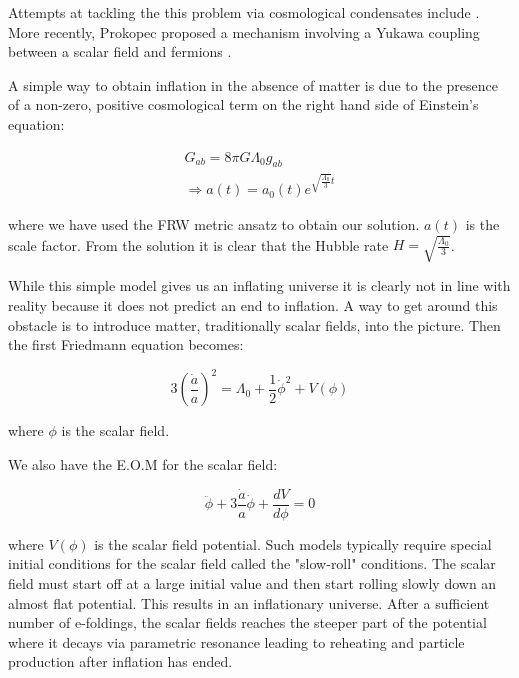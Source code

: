 \begin{doublespace}
\begin{itemize}
\end{itemize}

Attempts at tackling the this problem via cosmological condensates
include \cite{Brandenberger1997Asymptotic, Brout2003Condensation, Arkani-Hamed2004Ghost,
Alexander2004, Alexander2005A-Quantum}. More recently, Prokopec proposed a
mechanism involving a Yukawa coupling between a scalar field and
fermions \cite{Prokopec2006Solution}.

A simple way to obtain inflation in the absence of matter is due to
the presence of a non-zero, positive cosmological term on the right
hand side of Einstein's equation:

\begin{align}
    G_{ab} = 8\pi G \Lambda_0 g_{ab}\nonumber \\
   \Rightarrow a(t) = a_0 (t) e^{\sqrt{\frac{\Lambda_0}{3}}t}
\end{align}

where we have used the FRW metric ansatz to obtain our solution.
$a(t)$ is the scale factor.  From the solution it is clear that the
Hubble rate $H = \sqrt{\frac{\Lambda_0}{3}}$.

While this simple model gives us an inflating universe it is clearly
not in line with reality because it does not predict an end to
inflation.  A way to get around this obstacle is to introduce
matter, traditionally scalar fields, into the picture. Then the
first Friedmann equation becomes:

\begin{equation}
    3\left( \frac{\dot a}{a} \right)^2 = \Lambda_0 + \frac{1}{2}
    \dot \phi^2 + V(\phi)
\end{equation}

where $\phi$ is the scalar field.

We also have the E.O.M for the scalar field:

\begin{equation}
    \ddot \phi + 3 \frac{\dot a}{a} \dot \phi + \frac{dV}{d\phi} = 0
\end{equation}

where $V(\phi)$ is the scalar field potential. Such models typically
require special initial conditions for the scalar field called the
"slow-roll" conditions. The scalar field must start off at a large
initial value and then start rolling slowly down an almost flat
potential. This results in an inflationary universe. After a
sufficient number of e-foldings, the scalar fields reaches the
steeper part of the potential where it decays via parametric
resonance leading to reheating and particle production after
inflation has ended.


\end{doublespace}
